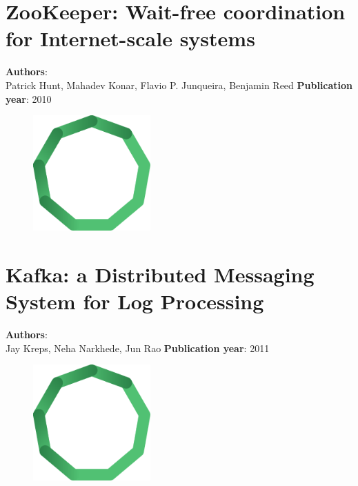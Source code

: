 \documentclass[11pt,fleqn]{book} %
\begin{document}
\chapter{ZooKeeper: Wait-free coordination for Internet-scale systems}
\vspace*{-7mm}
\Large \textbf{Authors}: \\
Patrick Hunt, Mahadev Konar, Flavio P. Junqueira, Benjamin Reed
\newline\newline
\textbf{Publication year}: 2010
\begin{figure}[b]
    \centering
    \includegraphics[width=0.4\textwidth]{distributed-systems.pdf}
\end{figure}


\chapter{Kafka: a Distributed Messaging System for Log Processing}
\vspace*{-7mm}
\Large \textbf{Authors}: \\
Jay Kreps, Neha Narkhede, Jun Rao
\newline\newline
\textbf{Publication year}: 2011
\begin{figure}[b]
    \centering
    \includegraphics[width=0.4\textwidth]{distributed-systems.pdf}
\end{figure}

\end{document}
